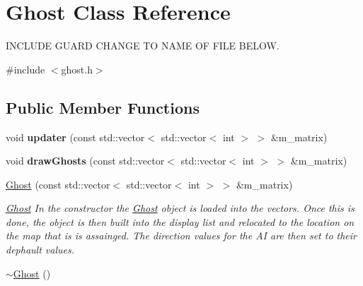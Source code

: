 \hypertarget{classGhost}{
\section{Ghost Class Reference}
\label{classGhost}
}


INCLUDE GUARD CHANGE TO NAME OF FILE BELOW.  


{\ttfamily \#include $<$ghost.h$>$}\subsection*{Public Member Functions}
\begin{DoxyCompactItemize}
\item 
\hypertarget{classGhost_a6fd630af8f0288c7957bb47c585a7fb8}{
void {\bfseries updater} (const std::vector$<$ std::vector$<$ int $>$ $>$ \&m\_\-matrix)}
\label{classGhost_a6fd630af8f0288c7957bb47c585a7fb8}

\item 
\hypertarget{classGhost_a33f64ecfac8e3c77535bd5f6f8d21f09}{
void {\bfseries drawGhosts} (const std::vector$<$ std::vector$<$ int $>$ $>$ \&m\_\-matrix)}
\label{classGhost_a33f64ecfac8e3c77535bd5f6f8d21f09}

\item 
\hyperlink{classGhost_a3244427b4bc41dd7ffdb2d3dcd7896f3}{Ghost} (const std::vector$<$ std::vector$<$ int $>$ $>$ \&m\_\-matrix)
\begin{DoxyCompactList}\small\item\em \hyperlink{classGhost}{Ghost} In the constructor the \hyperlink{classGhost}{Ghost} object is loaded into the vectors. Once this is done, the object is then built into the display list and relocated to the location on the map that is is assainged. The direction values for the AI are then set to their dephault values. \item\end{DoxyCompactList}\item 
\hyperlink{classGhost_a063ed19c1b6f5c07b9109020c6198319}{$\sim$Ghost} ()
\end{DoxyCompactItemize}
